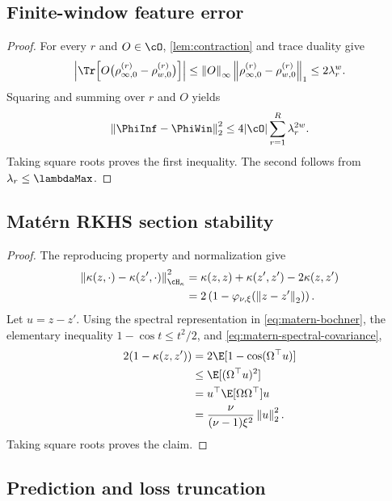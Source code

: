 \subsection{Finite-window feature error}

\begin{proof}
For every \(r\) and \(O\in\cO\), \cref{lem:contraction} and trace duality give
\[
    \abs{
      \Tr\!\left[
        O\bigl(\rho_{\infty,0}^{(r)}-\rho_{w,0}^{(r)}\bigr)
      \right]
    }
    \leq
    \opNorm{O}
    \traceNorm{\rho_{\infty,0}^{(r)}-\rho_{w,0}^{(r)}}
    \leq2\lambda_r^w.
\]
Squaring and summing over \(r\) and \(O\) yields
\[
    \norm{\PhiInf-\PhiWin}_2^2
    \leq4|\cO|\sum_{r=1}^R\lambda_r^{2w}.
\]
Taking square roots proves the first inequality. The second follows from
\(\lambda_r\leq\lambdaMax\).
\end{proof}

\subsection{Mat\'ern RKHS section stability}

\begin{proof}
The reproducing property and normalization give
\begin{align*}
    \norm{\kappa(z,\cdot)-\kappa(z',\cdot)}_{\cH_\kappa}^2
    &=
    \kappa(z,z)+\kappa(z',z')-2\kappa(z,z')\\
    &=
    2\left(1-\varphi_{\nu,\xi}(\norm{z-z'}_2)\right).
\end{align*}
Let \(u=z-z'\). Using the spectral representation in
\cref{eq:matern-bochner}, the elementary inequality
\(1-\cos t\leq t^2/2\), and
\cref{eq:matern-spectral-covariance},
\begin{align*}
    2(1-\kappa(z,z'))
    &=
    2\E[1-\cos(\Omega^\top u)]\\
    &\leq
    \E[(\Omega^\top u)^2]\\
    &=
    u^\top\E[\Omega\Omega^\top]u\\
    &=
    \frac{\nu}{(\nu-1)\xi^2}\norm u_2^2.
\end{align*}
Taking square roots proves the claim.
\end{proof}

\subsection{Prediction and loss truncation}

